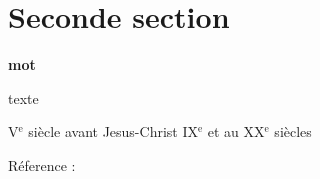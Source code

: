 
\section{Seconde section}

{\bf mot} 

\vspace{.7cm}

texte

{\footnotesize V}$^\text{e}$ siècle avant Jesus-Christ
{\footnotesize IX}$^\text{e}$  et au {\footnotesize XX}$^\text{e}$ siècles

 \label{labelLivre2}

Réference : \cite{nomLivre2}
